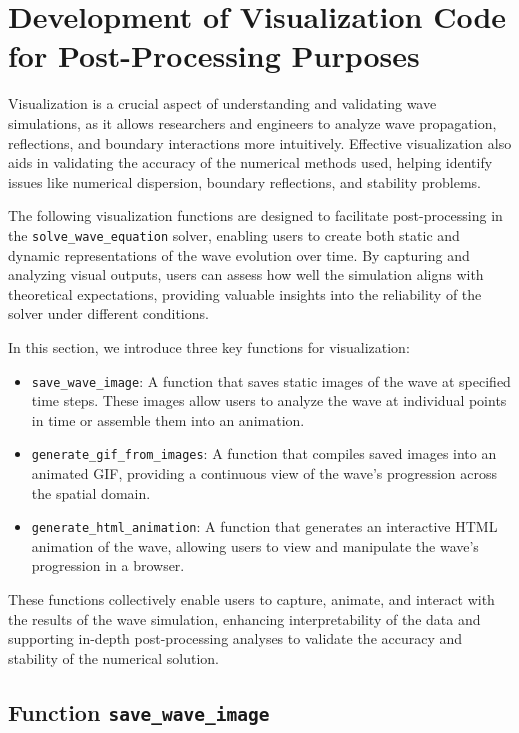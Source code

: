 \documentclass{article}
\begin{document}
		\newpage	
	\section{Development of Visualization Code for Post-Processing Purposes}
	
		Visualization is a crucial aspect of understanding and validating wave simulations, as it allows researchers and engineers to analyze wave propagation, reflections, and boundary interactions more intuitively. Effective visualization also aids in validating the accuracy of the numerical methods used, helping identify issues like numerical dispersion, boundary reflections, and stability problems.
		
		The following visualization functions are designed to facilitate post-processing in the \texttt{solve\_wave\_equation} solver, enabling users to create both static and dynamic representations of the wave evolution over time. By capturing and analyzing visual outputs, users can assess how well the simulation aligns with theoretical expectations, providing valuable insights into the reliability of the solver under different conditions.
		
		In this section, we introduce three key functions for visualization:
		\begin{itemize}
			\item \texttt{save\_wave\_image}: A function that saves static images of the wave at specified time steps. These images allow users to analyze the wave at individual points in time or assemble them into an animation.
			\item \texttt{generate\_gif\_from\_images}: A function that compiles saved images into an animated GIF, providing a continuous view of the wave’s progression across the spatial domain.
			\item \texttt{generate\_html\_animation}: A function that generates an interactive HTML animation of the wave, allowing users to view and manipulate the wave’s progression in a browser.
		\end{itemize}
		
		These functions collectively enable users to capture, animate, and interact with the results of the wave simulation, enhancing interpretability of the data and supporting in-depth post-processing analyses to validate the accuracy and stability of the numerical solution.
		
		\subsection{Function \texttt{save\_wave\_image}}
		
\end{document}
